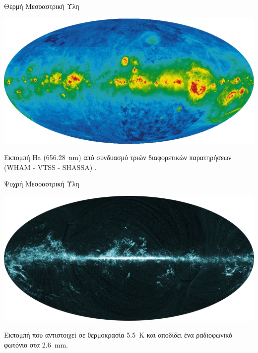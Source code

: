\documentclass{beamer}
\begin{document}
\begin{frame}{Θερμή Μεσοαστρική Ύλη}
\begin{center}
	\includegraphics[width=1\linewidth]{../Document/Images/Ha}
\end{center}
	Εκπομπή Ha (\SI{656.28}{nm}) από συνδυασμό τριών διαφορετικών παρατηρήσεων (WHAM - VTSS - SHASSA) \cite{finkbeiner_2003}. 
\end{frame}

\begin{frame}{Ψυχρή Μεσοαστρική Ύλη}
\begin{center}
	\includegraphics[width=1\linewidth]{../Document/Images/CO}
\end{center}
 Εκπομπή  που αντιστοιχεί σε θερμοκρασία \SI{5.5}{K} και αποδίδει ένα ραδιοφωνικό φωτόνιο στα \SI{2.6}{mm}.
\end{frame}
\end{document}
